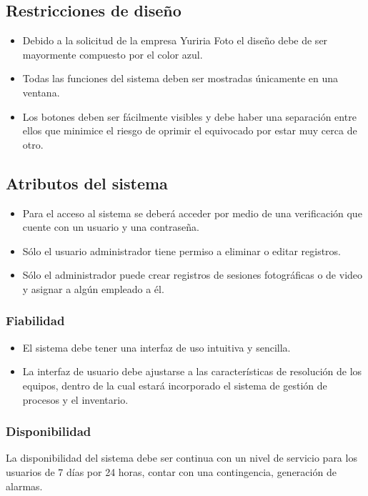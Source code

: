 \subsection{Restricciones de diseño}
\begin{itemize}
\item Debido a la solicitud de la empresa Yuriria Foto el diseño debe de ser mayormente compuesto por el color azul.
\item Todas las funciones del sistema deben ser mostradas únicamente en una ventana.
\item Los botones deben ser fácilmente visibles y debe haber una separación entre ellos que minimice el riesgo de oprimir el equivocado por estar muy cerca de otro.
\end{itemize}

\subsection{Atributos del sistema}
\begin{itemize}
\item Para el acceso al sistema se deberá acceder por medio de una verificación que cuente con un usuario y una contraseña.
\item Sólo el usuario administrador tiene permiso a eliminar o editar registros.
\item Sólo el administrador puede crear registros de sesiones fotográficas o de video y asignar a algún empleado a él.
\end{itemize}

\subsubsection{Fiabilidad}
\begin{itemize}
\item El sistema debe tener una interfaz de uso intuitiva y sencilla.
\item La interfaz de usuario debe ajustarse a las características de resolución de los equipos, dentro de la cual estará incorporado el sistema de gestión de procesos y el inventario.
\end{itemize}

\subsubsection{Disponibilidad}

La disponibilidad del sistema debe ser continua con un nivel de servicio para los usuarios de 7 días por 24 horas, contar con una contingencia, generación de alarmas. 


